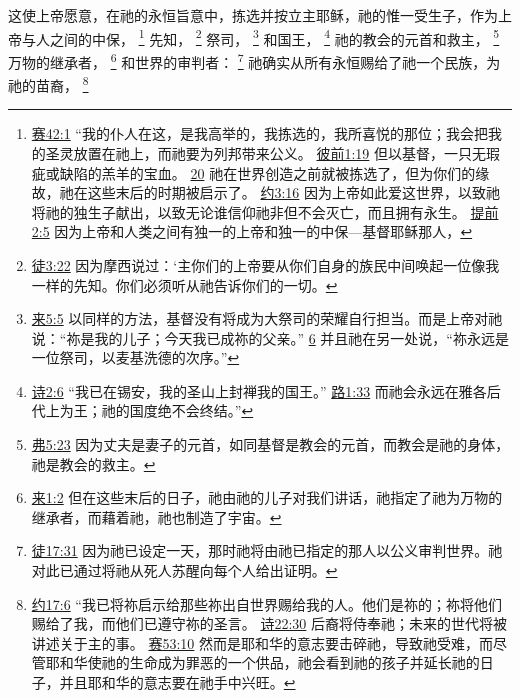 \documentclass[12pt, a4paper, oneside]{ctexart}
\newcounter{parnum}[section]
\newcommand{\N}{%
   \noindent\refstepcounter{parnum}%
    \makebox[\parindent][l]{\textbf{\arabic{parnum}.}}}
\begin{document}
\N 这使上帝愿意，在祂的永恒旨意中，拣选并按立主耶稣，祂的惟一受生子，作为上帝与人之间的中保，
	\footnote {
		\href{https://biblehub.com/isaiah/42-1.htm}{赛42:1} “我的仆人在这，是我高举的，我拣选的，我所喜悦的那位；我会把我的圣灵放置在祂上，而祂要为列邦带来公义。
		\href{https://biblehub.com/1_peter/1-19.htm}{彼前1:19} 但以基督，一只无瑕疵或缺陷的羔羊的宝血。
		\href{https://biblehub.com/1_peter/1-20.htm}{20} 祂在世界创造之前就被拣选了，但为你们的缘故，祂在这些末后的时期被启示了。
		\href{https://biblehub.com/john/3-16.htm}{约3:16} 因为上帝如此爱这世界，以致祂将祂的独生子献出，以致无论谁信仰祂非但不会灭亡，而且拥有永生。
		\href{https://biblehub.com/1_timothy/2-5.htm}{提前2:5} 因为上帝和人类之间有独一的上帝和独一的中保---基督耶稣那人，
	}
	先知，
	\footnote {
		\href{https://biblehub.com/acts/3-22.htm}{徒3:22} 因为摩西说过：‘主你们的上帝要从你们自身的族民中间唤起一位像我一样的先知。你们必须听从祂告诉你们的一切。
	}
	祭司，
	\footnote {
		\href{https://biblehub.com/hebrews/5-5.htm}{来5:5} 以同样的方法，基督没有将成为大祭司的荣耀自行担当。而是上帝对祂说：“祢是我的儿子；今天我已成祢的父亲。”
		\href{https://biblehub.com/hebrews/5-6.htm}{6} 并且祂在另一处说，“祢永远是一位祭司，以麦基洗德的次序。”
	}
	和国王，
	\footnote {
		\href{https://biblehub.com/psalms/2-6.htm}{诗2:6} “我已在锡安，我的圣山上封禅我的国王。”
		\href{https://biblehub.com/luke/1-33.htm}{路1:33} 而祂会永远在雅各后代上为王；祂的国度绝不会终结。”
	}
	祂的教会的元首和救主，
	\footnote {
		\href{https://biblehub.com/ephesians/5-23.htm}{弗5:23} 因为丈夫是妻子的元首，如同基督是教会的元首，而教会是祂的身体，祂是教会的救主。
	}
	万物的继承者，
	\footnote {
		\href{https://biblehub.com/hebrews/1-2.htm}{来1:2} 但在这些末后的日子，祂由祂的儿子对我们讲话，祂指定了祂为万物的继承者，而藉着祂，祂也制造了宇宙。
	}
	和世界的审判者：
	\footnote {
		\href{https://biblehub.com/acts/17-31.htm}{徒17:31} 因为祂已设定一天，那时祂将由祂已指定的那人以公义审判世界。祂对此已通过将祂从死人苏醒向每个人给出证明。
	}
	祂确实从所有永恒赐给了祂一个民族，为祂的苗裔，
	\footnote {
		\href{https://biblehub.com/john/17-6.htm}{约17:6} “我已将祢启示给那些祢出自世界赐给我的人。他们是祢的；祢将他们赐给了我，而他们已遵守祢的圣言。
		\href{https://biblehub.com/psalms/22-30.htm}{诗22:30} 后裔将侍奉祂；未来的世代将被讲述关于主的事。
		\href{https://biblehub.com/isaiah/53-10.htm}{赛53:10} 然而是耶和华的意志要击碎祂，导致祂受难，而尽管耶和华使祂的生命成为罪恶的一个供品，祂会看到祂的孩子并延长祂的日子，并且耶和华的意志要在祂手中兴旺。
	}
\end{document}
